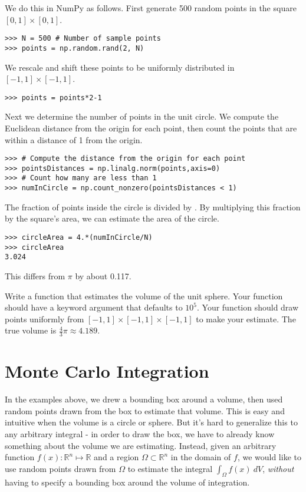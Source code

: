 We do this in NumPy as follows. First generate 500 random points in the square $[0,1] \times [0,1]$.
\begin{lstlisting}
>>> N = 500 # Number of sample points
>>> points = np.random.rand(2, N)
\end{lstlisting}
We rescale and shift these points to be uniformly distributed in $[-1,1]\times[-1,1]$.
\begin{lstlisting}
>>> points = points*2-1
\end{lstlisting}
Next we determine the number of points in the unit circle.
We compute the Euclidean distance from the origin for each point, then count the points that are within a distance of 1 from the origin.
\begin{lstlisting}
>>> # Compute the distance from the origin for each point
>>> pointsDistances = np.linalg.norm(points,axis=0)
>>> # Count how many are less than 1
>>> numInCircle = np.count_nonzero(pointsDistances < 1)
\end{lstlisting}
The fraction of points inside the circle is  divided by . By multiplying this fraction by the square's area, we can estimate the area of the circle. 
\begin{lstlisting}
>>> circleArea = 4.*(numInCircle/N)
>>> circleArea
3.024
\end{lstlisting}
This differs from $\pi$ by about 0.117.

\begin{problem}
\label{prob:sphere}
Write a function that estimates the volume of the unit sphere. Your function should have a keyword argument  that defaults to $10^5$. Your function should draw  points uniformly from $[-1,1]\times[-1,1]\times[-1,1]$ to make your estimate. The true volume is $\frac{4}{3}\pi \approx 4.189$.
\end{problem}


\section*{Monte Carlo Integration}

In the examples above, we drew a bounding box around a volume, then used random points drawn from the box to estimate that volume. 
This is easy and intuitive when the volume is a circle or sphere.
But it's hard to generalize this to any arbitrary integral - in order to draw the box, we have to already know something about the volume we are estimating.
Instead, given an arbitrary function $f(x) : \mathbb{R}^n \mapsto \mathbb{R} $ and a region $\Omega \subset \mathbb{R}^n$ in the domain of $f$, we would like to use random points drawn from $\Omega$ to estimate the integral 
$\int_\Omega f(x)\:dV$,
\textit{without} having to specify a bounding box around the volume of integration. 

